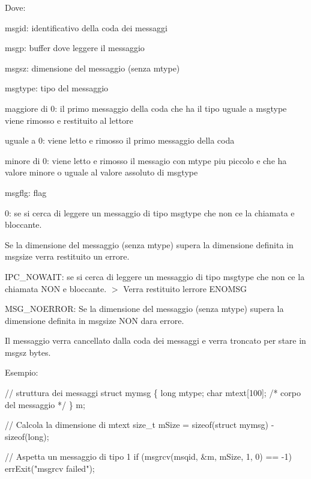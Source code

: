 Dove\+:
\begin{DoxyItemize}
\item {\ttfamily msgid}\+: identificativo della coda dei messaggi
\item {\ttfamily msgp}\+: buffer dove leggere il messaggio
\item {\ttfamily msgsz}\+: dimensione del messaggio (senza {\ttfamily mtype})
\item {\ttfamily msgtype}\+: tipo del messaggio
\begin{DoxyItemize}
\item maggiore di 0\+: il primo messaggio della coda che ha il tipo uguale a msgtype viene rimosso e restituito al lettore
\item uguale a 0\+: viene letto e rimosso il primo messaggio della coda
\item minore di 0\+: viene letto e rimosso il messagio con mtype piu\textquotesingle{} piccolo e che ha valore minore o uguale al valore assoluto di {\ttfamily msgtype}
\end{DoxyItemize}
\item {\ttfamily msgflg}\+: flag
\begin{DoxyItemize}
\item 0\+: se si cerca di leggere un messaggio di tipo msgtype che non c\textquotesingle{}e\textquotesingle{} la chiamata e\textquotesingle{} bloccante.

Se la dimensione del messaggio (senza mtype) supera la dimensione definita in msgsize verra\textquotesingle{} restituito un errore.
\item {\ttfamily I\+P\+C\+\_\+\+N\+O\+W\+A\+IT}\+: se si cerca di leggere un messaggio di tipo msgtype che non c\textquotesingle{}e\textquotesingle{} la chiamata N\+ON e\textquotesingle{} bloccante. $>$ Verra\textquotesingle{} restituito l\textquotesingle{}errore E\+N\+O\+M\+SG
\item {\ttfamily M\+S\+G\+\_\+\+N\+O\+E\+R\+R\+OR}\+: Se la dimensione del messaggio (senza mtype) supera la dimensione definita in msgsize N\+ON dara\textquotesingle{} errore.

Il messaggio verra\textquotesingle{} cancellato dalla coda dei messaggi e verra\textquotesingle{} troncato per stare in msgsz bytes.
\end{DoxyItemize}
\end{DoxyItemize}

Esempio\+: 
\begin{DoxyCode}
\textcolor{comment}{// struttura dei messaggi}
\textcolor{keyword}{struct }mymsg \{
    \textcolor{keywordtype}{long} mtype;
    \textcolor{keywordtype}{char} mtext[100]; \textcolor{comment}{/* corpo del messaggio */}
\} m;

\textcolor{comment}{// Calcola la dimensione di mtext}
\textcolor{keywordtype}{size\_t} mSize = \textcolor{keyword}{sizeof}(\textcolor{keyword}{struct }mymsg) - sizeof(long);

\textcolor{comment}{// Aspetta un messaggio di tipo 1}
\textcolor{keywordflow}{if} (msgrcv(msqid, &m, mSize, 1, 0) == -1)
    errExit(\textcolor{stringliteral}{"msgrcv failed"});
\end{DoxyCode}


